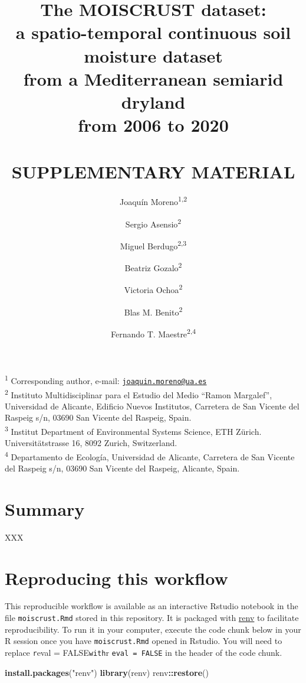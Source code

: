 \documentclass[]{article}
\title{The MOISCRUST dataset:\\
a spatio-temporal continuous soil moisture dataset\\
from a Mediterranean semiarid dryland\\
from 2006 to 2020\\
~\\
SUPPLEMENTARY MATERIAL}
\author{Joaquín Moreno\textsuperscript{1,2} \and Sergio Asensio\textsuperscript{2} \and Miguel Berdugo\textsuperscript{2,3} \and Beatriz Gozalo\textsuperscript{2} \and Victoria Ochoa\textsuperscript{2} \and Blas M. Benito\textsuperscript{2} \and Fernando T. Maestre\textsuperscript{2,4}}
\date{}
\newenvironment{Shaded}{\begin{snugshade}}{\end{snugshade}}
\newcommand{\KeywordTok}[1]{\textcolor[rgb]{0.13,0.29,0.53}{\textbf{#1}}}
\newcommand{\NormalTok}[1]{#1}
\newcommand{\OperatorTok}[1]{\textcolor[rgb]{0.81,0.36,0.00}{\textbf{#1}}}
\newcommand{\StringTok}[1]{\textcolor[rgb]{0.31,0.60,0.02}{#1}}
\begin{document}
\maketitle

{
\setcounter{tocdepth}{1}
\tableofcontents
}
\textsuperscript{1} Corresponding author, e-mail:
\href{mailto:joaquin.moreno@ua.es}{\nolinkurl{joaquin.moreno@ua.es}}\\
\textsuperscript{2} Instituto Multidisciplinar para el Estudio del Medio
``Ramon Margalef'', Universidad de Alicante, Edificio Nuevos Institutos,
Carretera de San Vicente del Raspeig s/n, 03690 San Vicente del Raspeig,
Spain.\\
\textsuperscript{3} Institut Department of Environmental Systems
Science, ETH Zürich. Universitätstrasse 16, 8092 Zurich, Switzerland.\\
\textsuperscript{4} Departamento de Ecología, Universidad de Alicante,
Carretera de San Vicente del Raspeig s/n, 03690 San Vicente del Raspeig,
Alicante, Spain.

\newpage

\hypertarget{summary}{%
\section{Summary}\label{summary}}

XXX

\hypertarget{reproducing-this-workflow}{%
\section{Reproducing this workflow}\label{reproducing-this-workflow}}

This reproducible workflow is available as an interactive Rstudio
notebook in the file \texttt{moiscrust.Rmd} stored in this repository.
It is packaged with \href{https://cran.r-project.org/package=renv}{renv}
to facilitate reproducibility. To run it in your computer, execute the
code chunk below in your R session once you have \texttt{moiscrust.Rmd}
opened in Rstudio. You will need to replace \texttt{r}eval =
FALSE\texttt{with}r \texttt{eval\ =\ FALSE} in the header of the code
chunk.

\begin{Shaded}
\begin{Highlighting}[]
\KeywordTok{install.packages}\NormalTok{(}\StringTok{"renv"}\NormalTok{)}
\KeywordTok{library}\NormalTok{(renv)}
\NormalTok{renv}\OperatorTok{::}\KeywordTok{restore}\NormalTok{()}
\end{Highlighting}
\end{Shaded}
\end{document}
